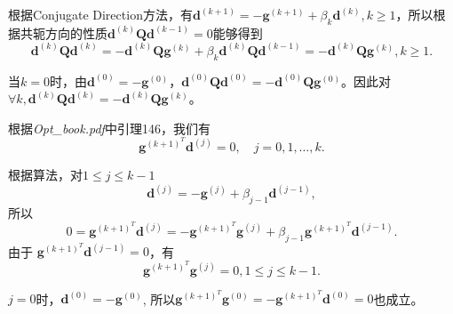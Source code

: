 \documentclass{homework}
\begin{document}
\begin{sol}

根据Conjugate Direction方法，有$\bm{d}^{(k+1)} = -\bm{g}^{(k+1)} + \beta_k \bm{d}^{(k)}, k\ge 1$，所以根据共轭方向的性质$\bm{d}^{(k)}\bm{Q}\bm{d}^{(k-1)}=0$能够得到
\[\bm{d}^{(k)}\bm{Q}\bm{d}^{(k)} = -\bm{d}^{(k)}\bm{Q}\bm{g}^{(k)} + \beta_k \bm{d}^{(k)}\bm{Q}\bm{d}^{(k-1)} =  -\bm{d}^{(k)}\bm{Q}\bm{g}^{(k)}, k\ge 1.\]

当$k=0$时，由$\bm{d}^{(0)} = -\bm{g}^{(0)}$，$\bm{d}^{(0)}\bm{Q}\bm{d}^{(0)} = -\bm{d}^{(0)}\bm{Q}\bm{g}^{(0)}$。因此对$\forall k, \bm{d}^{(k)}\bm{Q}\bm{d}^{(k)} =-\bm{d}^{(k)}\bm{Q}\bm{g}^{(k)}$。

\end{sol}

\question 

\begin{sol}
  根据\textit{Opt\_book.pdf}中引理146，我们有  
\begin{equation}\label{lemma}
    \mathbf{g}^{(k+1)^T} \mathbf{d}^{(j)} = 0,\quad j = 0, 1, \dots, k.
\end{equation}

根据算法，对$1\le j\le k-1$
\[\mathbf{d}^{(j)} = -\mathbf{g}^{(j)} + \beta_{j-1} \mathbf{d}^{(j-1)},\]
所以
\[0 = \mathbf{g}^{(k+1)^T} \mathbf{d}^{(j)}  = -\mathbf{g}^{(k+1)^T} \mathbf{g}^{(j)} + \beta_{j-1} \mathbf{g}^{(k+1)^T} \mathbf{d}^{(j-1)}.\]
由于 $\mathbf{g}^{(k+1)^T} \mathbf{d}^{(j-1)} = 0$，有
\[\mathbf{g}^{(k+1)^T} \mathbf{g}^{(j)} = 0, 1\le j\le k-1.\]

$j = 0$时，$\mathbf{d}^{(0)} = -\mathbf{g}^{(0)}$, 所以$\mathbf{g}^{(k+1)^T} \mathbf{g}^{(0)} = -\mathbf{g}^{(k+1)^T} \mathbf{d}^{(0)} = 0$也成立。

\end{sol}

\question 
\end{document}
